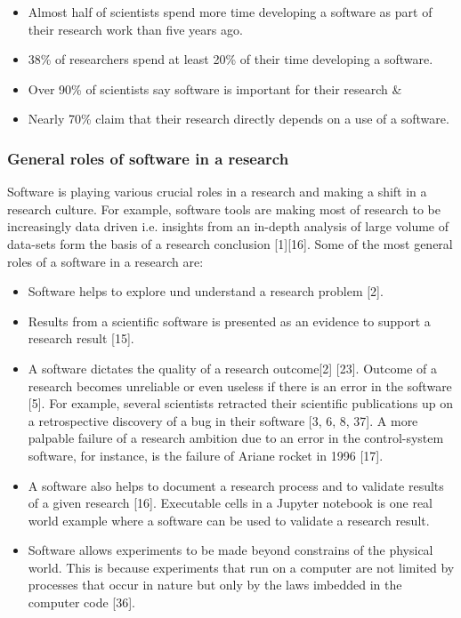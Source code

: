 \documentclass[12pt, a4paper]{article}
\begin{document}
\begin{itemize}[noitemsep,topsep=5pt, leftmargin=0.3in] %
	\item Almost half of scientists spend more time developing a software as part of their research work than five years ago.
	\item 38\% of researchers spend at least 20\% of their time developing a software.
	\item Over 90\% of scientists say software is important for their research \&
	\item Nearly 70\% claim that their research directly depends on a use of a software.  

\end{itemize}

\subsubsection{General roles of software in a research }

Software is playing various crucial roles in a research and making a shift in a research culture. For example, software tools are making most of research to be increasingly data driven i.e. insights from an in-depth analysis of large volume of data-sets form the basis of a research conclusion [1][16]. Some of the most general roles of a software in a research are:

\begin{itemize}[noitemsep,topsep=5pt, leftmargin=0.5in] %

	\item Software helps to explore und understand a research problem [2].
	\item Results from a scientific software is presented as an evidence to support a research result [15]. 
	\item A software dictates the quality of a research outcome[2] [23]. Outcome of a research becomes unreliable or even useless if there is an error in the software [5]. For example, several scientists retracted their scientific publications up on a retrospective discovery of a bug in their software [3, 6, 8, 37]. A more palpable failure of a research ambition due to an error in the control-system software, for instance, is the failure of Ariane rocket in 1996 [17].  
	\item A software also helps to document a research process and to validate results of a given research [16]. Executable cells in a Jupyter notebook is one real world example where a software can be used to validate a research result.
	\item Software allows experiments to be made beyond constrains of the physical world. This is because experiments that run on a computer are not limited by processes that occur in nature but only by the laws imbedded in the computer code [36]. 

\end{itemize}
\end{document}
